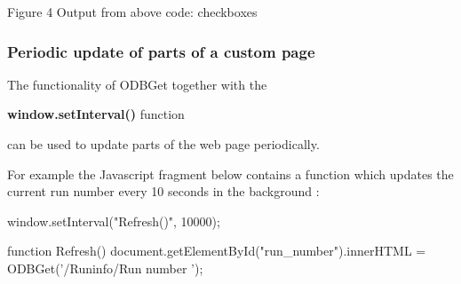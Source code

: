 \par
\par
\par
 \begin{center} Figure 4 Output from above code: checkboxes \par
\par
\par
  \par
\par
\par
 \end{center} 

\par


\par


\label{RC_mhttpd_custom_ODB_access_features_idx_mhttpd_page_custom_refresh_partial}
\hypertarget{RC_mhttpd_custom_ODB_access_features_idx_mhttpd_page_custom_refresh_partial}{}
 \hypertarget{RC_mhttpd_custom_ODB_access_features_RC_mhttpd_js_update_part}{}\subsubsection{Periodic update of parts of a custom page}\label{RC_mhttpd_custom_ODB_access_features_RC_mhttpd_js_update_part}
The functionality of ODBGet together with the
\begin{DoxyItemize}
\item {\bfseries window.setInterval()} function
\end{DoxyItemize}

can be used to update parts of the web page periodically. \par
 For example the Javascript fragment below contains a function which updates the current run number every 10 seconds in the background : 
\begin{DoxyCode}
  window.setInterval("Refresh()", 10000);

  function Refresh() {
    document.getElementById("run_number").innerHTML = ODBGet('/Runinfo/Run number
      ');
  }
\end{DoxyCode}


